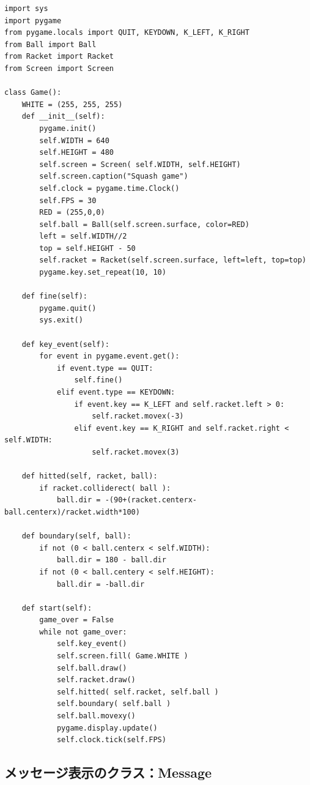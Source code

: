 \documentclass[uplatex,a4paper,11pt,oneside,openany]{jsbook}
\begin{document}
\begin{lstlisting}[caption=Gameクラス（racketオブジェクトを追加）,label=p1]
import sys
import pygame
from pygame.locals import QUIT, KEYDOWN, K_LEFT, K_RIGHT
from Ball import Ball
from Racket import Racket
from Screen import Screen

class Game():
    WHITE = (255, 255, 255)
    def __init__(self):
        pygame.init()
        self.WIDTH = 640
        self.HEIGHT = 480
        self.screen = Screen( self.WIDTH, self.HEIGHT)
        self.screen.caption("Squash game")
        self.clock = pygame.time.Clock()
        self.FPS = 30
        RED = (255,0,0)
        self.ball = Ball(self.screen.surface, color=RED)
        left = self.WIDTH//2
        top = self.HEIGHT - 50
        self.racket = Racket(self.screen.surface, left=left, top=top)
        pygame.key.set_repeat(10, 10)

    def fine(self):
        pygame.quit()
        sys.exit()

    def key_event(self):
        for event in pygame.event.get():
            if event.type == QUIT:
                self.fine()
            elif event.type == KEYDOWN:
                if event.key == K_LEFT and self.racket.left > 0:
                    self.racket.movex(-3)
                elif event.key == K_RIGHT and self.racket.right < self.WIDTH:
                    self.racket.movex(3)

    def hitted(self, racket, ball):
        if racket.colliderect( ball ):
            ball.dir = -(90+(racket.centerx-ball.centerx)/racket.width*100)

    def boundary(self, ball):
        if not (0 < ball.centerx < self.WIDTH):
            ball.dir = 180 - ball.dir
        if not (0 < ball.centery < self.HEIGHT):
            ball.dir = -ball.dir

    def start(self):
        game_over = False
        while not game_over:
            self.key_event()
            self.screen.fill( Game.WHITE )
            self.ball.draw()
            self.racket.draw()
            self.hitted( self.racket, self.ball )
            self.boundary( self.ball )
            self.ball.movexy()
            pygame.display.update()
            self.clock.tick(self.FPS)
\end{lstlisting}

\subsection{メッセージ表示のクラス：Message}
\end{document}
